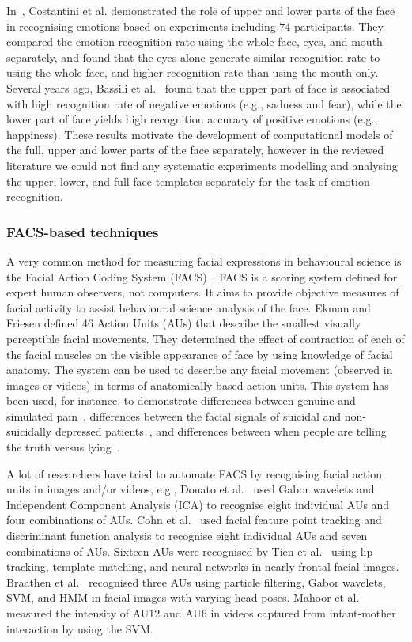\documentclass[10pt,journal,cspaper,compsoc]{IEEEtran}
\begin{document}
In~\cite{costantini2005recognising}, Costantini et al. demonstrated the role of upper and lower parts of the face in recognising emotions based on experiments including $74$ participants. They compared the emotion recognition rate using the whole face, eyes, and mouth separately, and found that the eyes alone generate similar recognition rate to using the whole face, and higher recognition rate than using the mouth only. Several years ago, Bassili et al.~\cite{bassili1979emotion} found that the upper part of face is associated with high recognition rate of negative emotions (e.g., sadness and fear), while the lower part of face yields high recognition accuracy of positive emotions (e.g., happiness). These results motivate the development of computational models of the full, upper and lower parts of the face separately, however in the reviewed literature we could not find any systematic experiments modelling and analysing the upper, lower, and full face templates separately for the task of emotion recognition.

\subsubsection{FACS-based techniques}

A very common method for measuring facial expressions in behavioural science is the Facial Action Coding System (FACS)~\cite{ekman1976measuring, Ekman78}. FACS is a scoring system defined for expert human observers, not computers. It aims to provide objective measures of facial activity to assist behavioural science analysis of the face. Ekman and Friesen defined 46 Action Units (AUs) that describe the smallest visually perceptible facial movements. They determined the effect of contraction of each of the facial muscles on the visible appearance of face by using knowledge of facial anatomy. The system can be used to describe any facial movement (observed in images or videos) in terms of anatomically based action units. This system has been used, for instance, to demonstrate differences between genuine and simulated pain~\cite{Littlewort09}, differences between the facial signals of  suicidal and non-suicidally depressed patients~\cite{heller1997depression}, and differences between when people are telling the truth versus lying~\cite{ekman2009telling}.

A lot of researchers have tried to automate FACS by recognising facial action units in images and/or videos, e.g.,  Donato et al.~\cite{donato1999classifying} used Gabor wavelets and Independent Component Analysis (ICA) to recognise eight individual AUs and four combinations of AUs. Cohn et al.~\cite{cohn1999automated} used facial feature point tracking and discriminant function analysis to recognise eight individual AUs and seven combinations of AUs. Sixteen AUs were recognised by Tien et al.~\cite{tian2001recognizing} using lip tracking, template matching, and neural networks in nearly-frontal facial images. Braathen et al.~\cite{braathen2002approach} recognised three AUs using particle filtering, Gabor wavelets, SVM, and HMM in facial images with varying head poses. Mahoor et al.~\cite{Mahoor09} measured the intensity of AU12 and AU6 in videos captured from infant-mother interaction by using the SVM.
\end{document}
